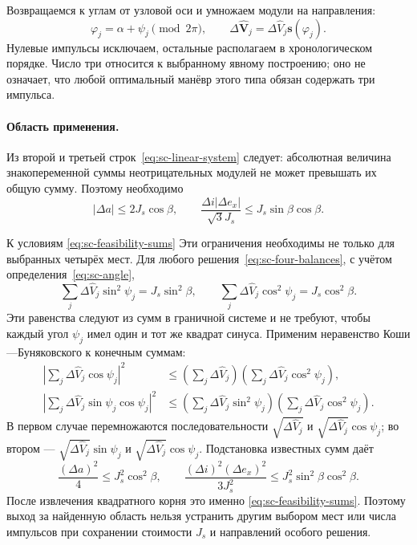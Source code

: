 Возвращаемся к углам от узловой оси и умножаем модули на направления:
\begin{equation}
 \varphi_j=\alpha+\psi_j\pmod{2\pi},\qquad
 \Delta\widehat{\boldsymbol V}_j=
       \Delta\widehat V_j\boldsymbol s(\varphi_j).
 \label{eq:sc-final-impulses}
\end{equation}
Нулевые импульсы исключаем, остальные располагаем в хронологическом
порядке. Число три относится к выбранному явному построению;
оно не означает, что любой оптимальный манёвр этого типа обязан
содержать три импульса.

\paragraph{Область применения.}
Из второй и третьей строк~\eqref{eq:sc-linear-system} следует:
абсолютная величина знакопеременной суммы неотрицательных модулей
не может превышать их общую сумму. Поэтому необходимо
\begin{equation}
 |\Delta a|\leq2J_s\cos\beta,\qquad
 \frac{\Delta i|\Delta e_x|}{\sqrt3J_s}\leq J_s\sin\beta\cos\beta.
 \label{eq:sc-feasibility-sums}
\end{equation}
\begin{explanation}{К условиям \eqref{eq:sc-feasibility-sums}}
Эти ограничения необходимы не только для выбранных четырёх мест.
Для любого решения~\eqref{eq:sc-four-balances}, с учётом
определения~\eqref{eq:sc-angle},
\[
 \sum_j\Delta\widehat V_j\sin^2\psi_j=J_s\sin^2\beta,\qquad
 \sum_j\Delta\widehat V_j\cos^2\psi_j=J_s\cos^2\beta.
\]
Эти равенства следуют из сумм в граничной системе и не требуют,
чтобы каждый угол $\psi_j$ имел один и тот же квадрат синуса.
Применим неравенство Коши---Буняковского к конечным суммам:
\[
\begin{aligned}
 \left|\sum_j\Delta\widehat V_j\cos\psi_j\right|^2
 &\leq\left(\sum_j\Delta\widehat V_j\right)
       \left(\sum_j\Delta\widehat V_j\cos^2\psi_j\right),\\
 \left|\sum_j\Delta\widehat V_j\sin\psi_j\cos\psi_j\right|^2
 &\leq\left(\sum_j\Delta\widehat V_j\sin^2\psi_j\right)
       \left(\sum_j\Delta\widehat V_j\cos^2\psi_j\right).
\end{aligned}
\]
В первом случае перемножаются последовательности
$\sqrt{\Delta\widehat V_j}$ и
$\sqrt{\Delta\widehat V_j}\cos\psi_j$; во втором ---
$\sqrt{\Delta\widehat V_j}\sin\psi_j$ и
$\sqrt{\Delta\widehat V_j}\cos\psi_j$.
Подстановка известных сумм даёт
\[
 \frac{(\Delta a)^2}{4}\leq J_s^2\cos^2\beta,\qquad
 \frac{(\Delta i)^2(\Delta e_x)^2}{3J_s^2}
       \leq J_s^2\sin^2\beta\cos^2\beta.
\]
После извлечения квадратного корня это именно
\eqref{eq:sc-feasibility-sums}. Поэтому выход за найденную область
нельзя устранить другим выбором мест или числа импульсов
при сохранении стоимости $J_s$ и направлений особого решения.
\end{explanation}

